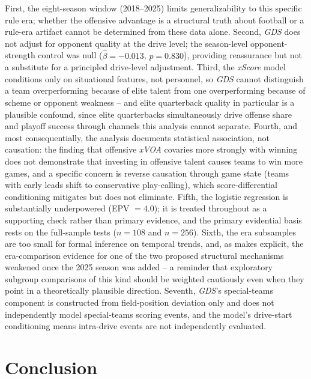 \documentclass[12pt,a4paper]{article}
\newcommand{\xscore}{\textit{xScore}}
\newcommand{\xvoa}{\textit{xVOA}}
\newcommand{\gds}{\textit{GDS}}
\begin{document}
First, the eight-season window (2018--2025) limits generalizability to this specific rule era; whether the offensive advantage is a structural truth about football or a rule-era artifact cannot be determined from these data alone. Second, \gds{} does not adjust for opponent quality at the drive level; the season-level opponent-strength control was null ($\hat\beta=-0.013$, $p=0.830$), providing reassurance but not a substitute for a principled drive-level adjustment. Third, the \xscore{} model conditions only on situational features, not personnel, so \gds{} cannot distinguish a team overperforming because of elite talent from one overperforming because of scheme or opponent weakness -- and elite quarterback quality in particular is a plausible confound, since elite quarterbacks simultaneously drive offense share and playoff success through channels this analysis cannot separate. Fourth, and most consequentially, the analysis documents statistical association, not causation: the finding that offensive \xvoa{} covaries more strongly with winning does not demonstrate that investing in offensive talent causes teams to win more games, and a specific concern is reverse causation through game state (teams with early leads shift to conservative play-calling), which score-differential conditioning mitigates but does not eliminate. Fifth, the logistic regression is substantially underpowered (EPV $=4.0$); it is treated throughout as a supporting check rather than primary evidence, and the primary evidential basis rests on the full-sample tests ($n=108$ and $n=256$). Sixth, the era subsamples are too small for formal inference on temporal trends, and, as  makes explicit, the era-comparison evidence for one of the two proposed structural mechanisms weakened once the 2025 season was added -- a reminder that exploratory subgroup comparisons of this kind should be weighted cautiously even when they point in a theoretically plausible direction. Seventh, \gds{}'s special-teams component is constructed from field-position deviation only and does not independently model special-teams scoring events, and the model's drive-start conditioning means intra-drive events are not independently evaluated.

\section{Conclusion}
\label{sec:conclusion}
\end{document}
